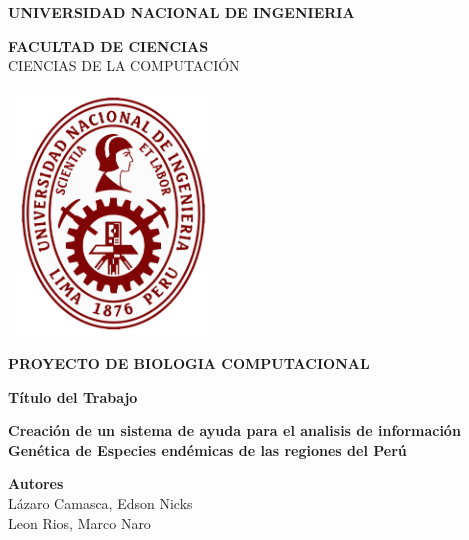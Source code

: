 \documentclass[a4paper]{article}
\begin{document}
\begin{titlepage}
\begin{center}
\vspace*{-0.4in}

{\fontsize{12}{30}\bf \selectfont UNIVERSIDAD NACIONAL DE INGENIERIA\\}

{\fontsize{12}{40}\bf \selectfont FACULTAD DE CIENCIAS\\}
\vspace*{0.15in} CIENCIAS DE LA COMPUTACI\'ON\\
\vspace*{0.2in}


\begin{center}
\includegraphics[width=5.5cm,height=6.5cm]{UNI.png}
\end{center}
\vspace*{0.2in}

\begin{large}
	{\bf PROYECTO DE BIOLOGIA COMPUTACIONAL\\}
	\vspace*{0.3in}
\end{large}

\begin{large}
{\bf T\'itulo del Trabajo\\}
\vspace*{0.2in}
\end{large}

\begin{Large}
\color{blue}
\textbf{Creación de un sistema de ayuda para el analisis de información Genética de Especies endémicas de las regiones del Perú\\}
\color{black}
\end{Large}
\vspace*{0.2in}

\begin{large}
{\bf Autores} 
\vspace*{0.1in}
\\L\'azaro Camasca, Edson Nicks\\
Leon Rios, Marco Naro
\end{large}
\vspace*{0.4in}



\end{center}
\end{titlepage}
\end{document}
